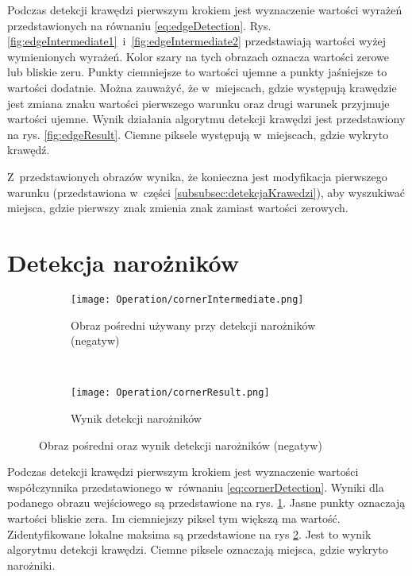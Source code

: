 Podczas detekcji krawędzi pierwszym krokiem jest wyznaczenie wartości wyrażeń przedstawionych na równaniu \eqref{eq:edgeDetection}. Rys. \ref{fig:edgeIntermediate1}~i~\ref{fig:edgeIntermediate2} przedstawiają wartości wyżej wymienionych wyrażeń. Kolor szary na tych obrazach oznacza wartości zerowe lub bliskie zeru. Punkty ciemniejsze to wartości ujemne a punkty jaśniejsze to wartości dodatnie. Można zauważyć, że w~miejscach, gdzie występują krawędzie jest zmiana znaku wartości pierwszego warunku oraz drugi warunek przyjmuje wartości ujemne. Wynik działania algorytmu detekcji krawędzi jest przedstawiony na rys. \ref{fig:edgeResult}. Ciemne piksele występują w~miejscach, gdzie wykryto krawędź.

Z~przedstawionych obrazów wynika, że konieczna jest modyfikacja pierwszego warunku (przedstawiona w~części \ref{subsubsec:detekcjaKrawedzi}), aby wyszukiwać miejsca, gdzie pierwszy znak zmienia znak zamiast wartości zerowych.

\section{Detekcja narożników}
\label{sec:dzialanieCorner}

\begin{figure}[h]
\begin{center}

\begin{subfigure}[t]{0.3\textwidth}
\texttt{[image: Operation/cornerIntermediate.png]}
\caption{Obraz pośredni używany przy detekcji narożników (negatyw)}
\label{fig:cornerIntermediate}
\end{subfigure}
~
\begin{subfigure}[t]{0.3\textwidth}
\texttt{[image: Operation/cornerResult.png]}
\caption{Wynik detekcji narożników}
\label{fig:cornerResult}
\end{subfigure}

\end{center}
\label{fig:showEdge}
\caption{Obraz pośredni oraz wynik detekcji narożników (negatyw)}
\end{figure}

Podczas detekcji krawędzi pierwszym krokiem jest wyznaczenie wartości współczynnika przedstawionego w~równaniu \eqref{eq:cornerDetection}. Wyniki dla podanego obrazu wejściowego są przedstawione na rys. \ref{fig:cornerIntermediate}. Jasne punkty oznaczają wartości bliskie zera. Im ciemniejszy piksel tym większą ma wartość. Zidentyfikowane lokalne maksima są przedstawione na rys \ref{fig:cornerResult}. Jest to wynik algorytmu detekcji krawędzi. Ciemne piksele oznaczają miejsca, gdzie wykryto narożniki.

